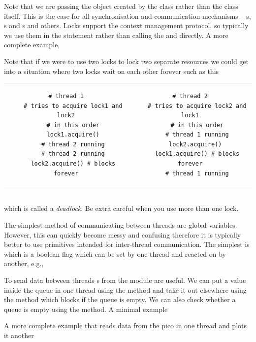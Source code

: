 Note that we are passing the object created by the  class rather than the class itself. This is the case for all synchronisation and communication mechanisms -- s, s and s and others. Locks support the context management protocol, so typically we use them in the  statement rather than calling the  and  directly. A more complete example,


Note that if we were to use two locks to lock two separate resources we could get into a situation where two locks wait on each other forever such as this\\
\begin{tabular}{cc}
\begin{lstlisting}[linewidth=0.5\linewidth]
    # thread 1
    # tries to acquire lock1 and lock2
    # in this order
    lock1.acquire()
    # thread 2 running
    # thread 2 running
    lock2.acquire() # blocks forever
\end{lstlisting}&
\begin{lstlisting}[linewidth=0.5\linewidth]
    # thread 2
    # tries to acquire lock2 and lock1
    # in this order
    # thread 1 running
    lock2.acquire() 
    lock1.acquire() # blocks forever
    # thread 1 running
\end{lstlisting}
\end{tabular}\\
which is called a \emph{deadlock}. Be extra careful when you use more than one lock.

The simplest method of communicating between threads are global variables. However, this can quickly become messy and confusing therefore it is typically better to use primitives intended for inter-thread communication. The simplest is  which is a boolean flag which can be set by one thread and reacted on by another, e.g.,


To send data between threads s from the module  are useful. We can put a value inside the queue in one thread using the  method and take it out elsewhere using the  method which blocks if the queue is empty. We can also check whether a queue is empty using the  method. A minimal example


A more complete example that reads data from the pico in one thread and plots it another


